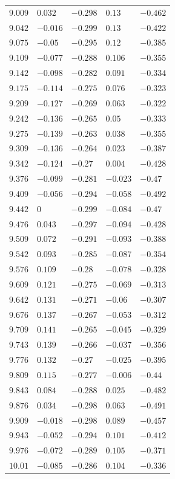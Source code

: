 \begin{center}
\begin{longtable}{lllll}
$9.009$&$0.032$&$-0.298$&$0.13$&$-0.462$\\
$9.042$&$-0.016$&$-0.299$&$0.13$&$-0.422$\\
$9.075$&$-0.05$&$-0.295$&$0.12$&$-0.385$\\
$9.109$&$-0.077$&$-0.288$&$0.106$&$-0.355$\\
$9.142$&$-0.098$&$-0.282$&$0.091$&$-0.334$\\
$9.175$&$-0.114$&$-0.275$&$0.076$&$-0.323$\\
$9.209$&$-0.127$&$-0.269$&$0.063$&$-0.322$\\
$9.242$&$-0.136$&$-0.265$&$0.05$&$-0.333$\\
$9.275$&$-0.139$&$-0.263$&$0.038$&$-0.355$\\
$9.309$&$-0.136$&$-0.264$&$0.023$&$-0.387$\\
$9.342$&$-0.124$&$-0.27$&$0.004$&$-0.428$\\
$9.376$&$-0.099$&$-0.281$&$-0.023$&$-0.47$\\
$9.409$&$-0.056$&$-0.294$&$-0.058$&$-0.492$\\
$9.442$&$0$&$-0.299$&$-0.084$&$-0.47$\\
$9.476$&$0.043$&$-0.297$&$-0.094$&$-0.428$\\
$9.509$&$0.072$&$-0.291$&$-0.093$&$-0.388$\\
$9.542$&$0.093$&$-0.285$&$-0.087$&$-0.354$\\
$9.576$&$0.109$&$-0.28$&$-0.078$&$-0.328$\\
$9.609$&$0.121$&$-0.275$&$-0.069$&$-0.313$\\
$9.642$&$0.131$&$-0.271$&$-0.06$&$-0.307$\\
$9.676$&$0.137$&$-0.267$&$-0.053$&$-0.312$\\
$9.709$&$0.141$&$-0.265$&$-0.045$&$-0.329$\\
$9.743$&$0.139$&$-0.266$&$-0.037$&$-0.356$\\
$9.776$&$0.132$&$-0.27$&$-0.025$&$-0.395$\\
$9.809$&$0.115$&$-0.277$&$-0.006$&$-0.44$\\
$9.843$&$0.084$&$-0.288$&$0.025$&$-0.482$\\
$9.876$&$0.034$&$-0.298$&$0.063$&$-0.491$\\
$9.909$&$-0.018$&$-0.298$&$0.089$&$-0.457$\\
$9.943$&$-0.052$&$-0.294$&$0.101$&$-0.412$\\
$9.976$&$-0.072$&$-0.289$&$0.105$&$-0.371$\\
$10.01$&$-0.085$&$-0.286$&$0.104$&$-0.336$\\

\end{longtable}
\end{center}
